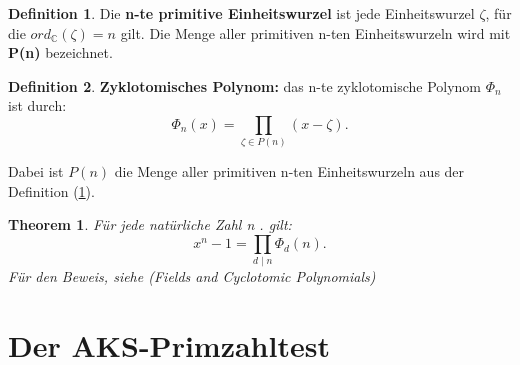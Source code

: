 \documentclass[12pt,oneside]{article}
\newtheorem{theorem}{Theorem}[section]
\theoremstyle{remark}
\theoremstyle{definition}
\newtheorem{definition}{Definition}[section]
\begin{document}
\smallskip

\begin{definition}\label{prim_ein}
Die \textbf{n-te primitive Einheitswurzel} ist jede Einheitswurzel $\zeta$, für die $ord_{\mathbb{C}}(\zeta) = n $ gilt. Die Menge aller primitiven n-ten Einheitswurzeln wird mit \textbf{P(n)} bezeichnet. 
\end{definition}

\smallskip

\begin{definition}
\textbf{Zyklotomisches Polynom:} das n-te zyklotomische Polynom $\Phi_{n}$ ist durch:\newline
\begin{equation}
    \Phi_{n}(x) = \prod_{\zeta \in P(n)} (x -\zeta).
\end{equation}

Dabei ist $P(n)$ die Menge aller primitiven n-ten Einheitswurzeln aus der Definition (\ref{prim_ein}). 
\end{definition}

\smallskip

\begin{theorem}
Für jede natürliche Zahl n . gilt:\newline
\begin{equation}
    x^n - 1 = \prod_{d \mid n} \Phi_{d}(n).
\end{equation}
Für den Beweis, siehe (Fields and Cyclotomic Polynomials) 
\end{theorem}

\smallskip


\section{Der AKS-Primzahltest}
\end{document}
